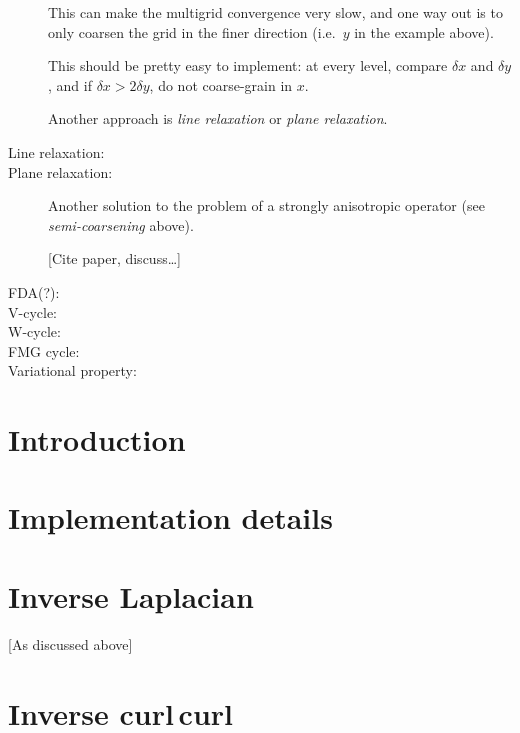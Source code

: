 \documentclass[\mydriver,12pt,twoside,notitlepage,letterpaper]{article}
\begin{document}
\begin{description}
  This can make the multigrid convergence very slow, and one way out is to
  only coarsen the grid in the finer direction (i.e.~$y$ in the example
  above).

  This should be pretty easy to implement: at every level, compare $\delta
  x$ and $\delta y$, and if $\delta x > 2\delta y$, do not coarse-grain in
  $x$.

  Another approach is \emph{line relaxation} or \emph{plane relaxation}.
  
\item[Line relaxation:]
\item[Plane relaxation:]
  Another solution to the problem of a strongly anisotropic operator (see
  \emph{semi-coarsening} above).

  [Cite paper, discuss\ldots]

\item[FDA(?):]
\item[V-cycle:]
\item[W-cycle:]
\item[FMG cycle:]
\item[Variational property:]
\end{description}


\section{Introduction}


\section{Implementation details}


\section{Inverse Laplacian}

[As discussed above]


\section{Inverse curl\,curl}
\end{document}
